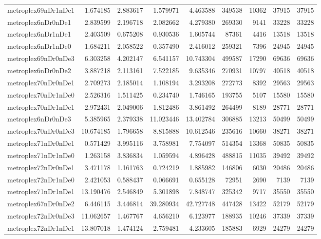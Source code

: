 \begin{longtable}{|l|r|r|r|r|r|r|r|r|}
metroplex69nDr1nDe1 & 1.674185 & 2.883617 & 1.579971 & 4.463588 & 349538 & 10362 & 37915 & 37915 \\
metroplex6nDr0nDe1 & 2.839599 & 2.196718 & 2.082662 & 4.279380 & 269330 & 9141 & 33228 & 33228 \\
metroplex6nDr1nDe1 & 2.403509 & 0.675208 & 0.930536 & 1.605744 & 87361 & 4416 & 13518 & 13518 \\
metroplex6nDr1nDe0 & 1.684211 & 2.058522 & 0.357490 & 2.416012 & 259321 & 7396 & 24945 & 24945 \\
metroplex69nDr0nDe3 & 6.303258 & 4.202147 & 6.541157 & 10.743304 & 499587 & 17290 & 69636 & 69636 \\
metroplex6nDr0nDe2 & 3.887218 & 2.113161 & 7.522185 & 9.635346 & 270931 & 10797 & 40518 & 40518 \\
metroplex70nDr0nDe1 & 2.709273 & 2.185014 & 1.108194 & 3.293208 & 272773 & 8392 & 29563 & 29563 \\
metroplex70nDr1nDe0 & 2.526316 & 1.511425 & 0.234740 & 1.746165 & 193755 & 5107 & 15580 & 15580 \\
metroplex70nDr1nDe1 & 2.972431 & 2.049006 & 1.812486 & 3.861492 & 264499 & 8189 & 28771 & 28771 \\
metroplex6nDr0nDe3 & 5.385965 & 2.379338 & 11.023446 & 13.402784 & 306885 & 13213 & 50499 & 50499 \\
metroplex70nDr0nDe3 & 10.674185 & 1.796658 & 8.815888 & 10.612546 & 235616 & 10660 & 38271 & 38271 \\
metroplex71nDr0nDe1 & 0.571429 & 3.995116 & 3.758981 & 7.754097 & 514354 & 13368 & 50835 & 50835 \\
metroplex71nDr1nDe0 & 1.263158 & 3.836834 & 1.059594 & 4.896428 & 488815 & 11035 & 39492 & 39492 \\
metroplex72nDr0nDe1 & 3.471178 & 1.161763 & 0.724219 & 1.885982 & 146806 & 6030 & 20486 & 20486 \\
metroplex72nDr1nDe0 & 2.421053 & 0.588437 & 0.066691 & 0.655128 & 72951 & 2690 & 7139 & 7139 \\
metroplex71nDr1nDe1 & 13.190476 & 2.546849 & 5.301898 & 7.848747 & 325342 & 9717 & 35550 & 35550 \\
metroplex67nDr0nDe2 & 6.446115 & 3.446814 & 39.280934 & 42.727748 & 447428 & 13422 & 52179 & 52179 \\
metroplex72nDr0nDe3 & 11.062657 & 1.467767 & 4.656210 & 6.123977 & 188935 & 10246 & 37339 & 37339 \\
metroplex72nDr1nDe1 & 13.807018 & 1.474124 & 2.759481 & 4.233605 & 185883 & 6929 & 24279 & 24279 \\

\end{longtable}
